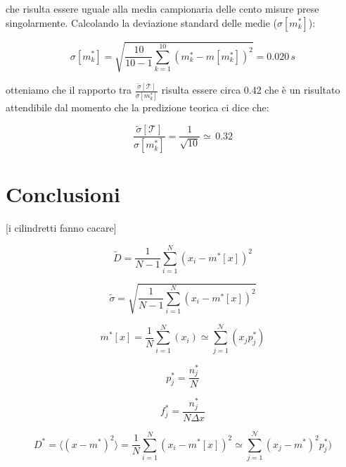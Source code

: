 \documentclass[12pt, twoside, a4paper]{article}
\begin{document}
che risulta essere uguale alla media campionaria delle cento misure prese singolarmente. Calcolando la deviazione standard delle medie ($ \sigma[m_k^*] $):

\begin{equation}
\sigma[m_k^*] = \sqrt{\frac{10}{10-1} \sum_{k=1}^{10} (m_k^* - m[m_k^*])^2} = 0.020\,s
\end{equation}

otteniamo che il rapporto tra $\frac{\tilde{\sigma}[\mathcal{T}]}{\sigma[m_k^*]}$ risulta essere circa 0.42 che è un risultato attendibile dal momento che la predizione teorica ci dice che:

\begin{equation}
\frac{\tilde{\sigma}[\mathcal{T}]}{\sigma[m_k^*]} = \frac{1}{\sqrt{10}} \simeq \, 0.32
\end{equation}








\newpage

\section{Conclusioni}
[i cilindretti fanno cacare]



\begin{equation}
\tilde{D} = \frac{1}{N - 1} \sum_{i=1}^{N} (x_i - m^*[x])^2
\end{equation}

\begin{equation}
\tilde{\sigma} = \sqrt{\frac{1}{N - 1} \sum_{i=1}^{N} (x_i - m^*[x])^2}
\end{equation}

\begin{equation}
m^*[x] = \frac{1}{N} \sum_{i=1}^{N} (x_i) \simeq \sum_{j=1}^{\mathcal{N}} (x_j p_j^*) 
\end{equation}

\begin{equation}
p_j^* = \frac{n_j^*}{N} 
\end{equation}

\begin{equation}
f_j^* = \frac{n_j^*}{N\Delta x}
\end{equation}

\begin{equation}
D^* = \langle(x - m^*)^2\rangle = \frac{1}{N} \sum_{i=1}^{N} (x_i - m^*[x])^2
\simeq \sum_{j=1}^{\mathcal{N}} (x_j - m^*)^2 p_j^*)
\end{equation}
\end{document}
